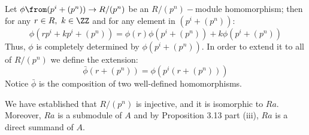 Let $\phi \from  (p^i+(p^n))\to R/(p^n)$ be an  $R/(p^n)-$module homomorphism; then for any $  r\in R, \ k\in \ZZ$   and for any element in $(p^i+(p^n))$: 
$$ \phi(rp^i+kp^i+(p^n))= \phi(r)\phi(p^i+(p^n))+k\phi(p^i+(p^n))$$
Thus, $\phi$ is completely determined by $\phi(p^i+(p^n))$. In order to extend it to all of $R/(p^n)$ we define the extension:
$$\bar \phi(r+(p^n))=\phi(p^i(r+(p^n)))$$
Notice $\bar \phi$ is the composition of two well-defined homomorphisms.

We have established that $R/(p^n)$ is injective, and it is isomorphic to $Ra$. Moreover, $Ra$ is a submodule of $A$ and by Proposition 3.13 part (iii), $Ra$ is a direct summand of $A$.

